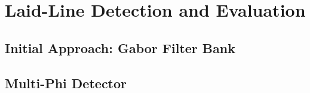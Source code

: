 \section{Laid-Line Detection and Evaluation}
\label{sec:detection}


\subsection{Initial Approach: Gabor Filter Bank}
\label{sec:detection:gabor}
%

\subsection{Multi-Phi Detector}
\label{sec:detection:multiphi}
%

